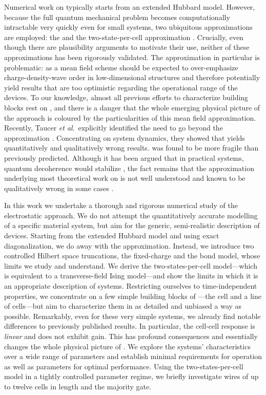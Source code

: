 Numerical work on  typically starts from an extended Hubbard model.
However, because the full quantum mechanical problem becomes computationally
intractable very quickly even for small systems, two ubiquitous approximations
are employed: the  and the two-state-per-cell approximation
\cite{lent1993quantum} \cite{tougaw1996dynamic}. Crucially, even though there
are plausibility arguments to motivate their use, neither of these
approximations has been rigorously validated. The  approximation in
particular is problematic: as a mean field scheme  should be expected
to over-emphasize charge-density-wave order in low-dimensional structures and
therefore potentially yield results that are too optimistic regarding the
operational range of the devices. To our knowledge, almost all previous efforts
to characterize  building blocks rest on , and there is a
danger that the whole emerging physical picture of the  approach is
coloured by the particularities of this mean field approximation. Recently,
Taucer \emph{et al}.~explicitly identified the need to go beyond the 
approximation \cite{taucer2012consequences}.  Concentrating on system dynamics,
they showed that  yields quantitatively and qualitatively wrong
results.  was found to be more fragile than previously predicted.
Although it has been argued that in practical systems, quantum decoherence would
stabilize , the fact remains that the approximation underlying most
theoretical work on  is not well understood and known to be
qualitatively wrong in some cases \cite{blair2013environmental}.

In this work we undertake a thorough and rigorous numerical study of the
electrostatic  approach. We do not attempt the quantitatively accurate
modelling of a specific material system, but aim for the generic, semi-realistic
description of  devices. Starting from the extended Hubbard model and
using exact diagonalization, we do away with the  approximation.
Instead, we introduce two controlled Hilbert space truncations, the fixed-charge
and the bond model, whose limits we study and understand. We derive the
two-states-per-cell model---which is equivalent to a transverse-field Ising
model---and show the limits in which it is an appropriate description of
 systems. Restricting ourselves to time-independent properties, we
concentrate on a few simple building blocks of ---the cell and a line
of cells---but aim to characterize them in as detailed and unbiased a way as
possible. Remarkably, even for these very simple  systems, we already
find notable differences to previously published results. In particular, the
cell-cell response is \emph{linear} and does not exhibit gain. This has profound
consequences and essentially changes the whole physical picture of .
We explore the systems' characteristics over a wide range of parameters and
establish minimal requirements for  operation as well as parameters
for optimal performance.  Using the two-states-per-cell model in a tightly
controlled parameter regime, we briefly investigate wires of up to twelve cells
in length and the majority gate.

